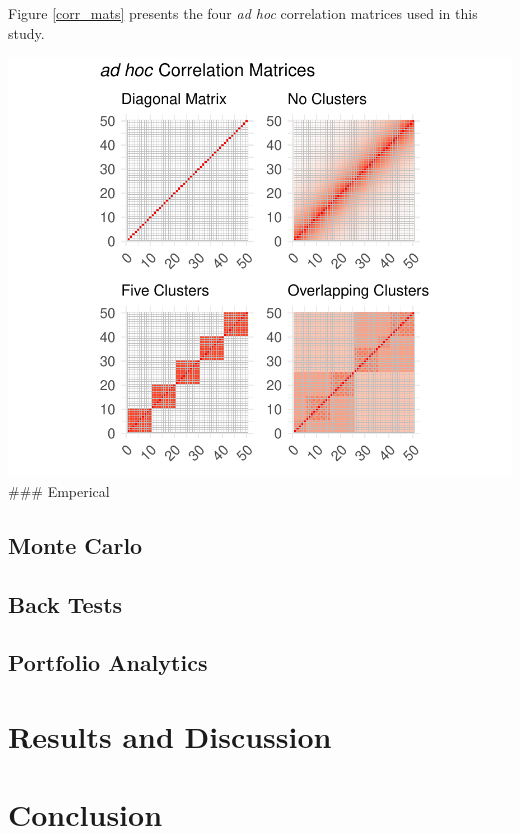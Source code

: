 \documentclass[11pt,preprint, authoryear]{elsarticle}
\numberwithin{equation}{section}
\numberwithin{figure}{section}
\numberwithin{table}{section}
\begin{document}
Figure \ref{corr_mats} presents the four \emph{ad hoc} correlation
matrices used in this study.

\includegraphics{Thesis_files/figure-latex/corr mats-1.pdf} \#\#\#
Emperical

\hypertarget{monte-carlo}{%
\subsection{Monte Carlo}\label{monte-carlo}}

\hypertarget{back-tests}{%
\subsection{Back Tests}\label{back-tests}}

\hypertarget{portfolio-analytics}{%
\subsection{Portfolio Analytics}\label{portfolio-analytics}}

\hypertarget{results-and-discussion}{%
\section{Results and Discussion}\label{results-and-discussion}}

\hypertarget{conclusion}{%
\section{Conclusion}\label{conclusion}}
\end{document}
